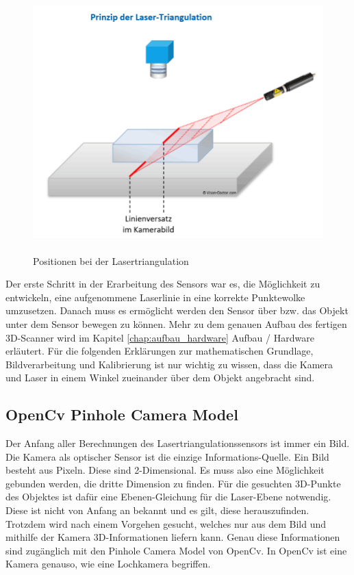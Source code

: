 	\begin{figure}[h]
		\centering
		\includegraphics[height=10cm]{img/grundlagen/lasertriangulation_2}
		\caption{Positionen bei der Lasertriangulation}
		\label{lasertriangulation}
	\end{figure}
	
	Der erste Schritt in der Erarbeitung des Sensors war es, die Möglichkeit zu entwickeln, eine aufgenommene Laserlinie in eine korrekte Punktewolke umzusetzen. Danach muss es ermöglicht werden den Sensor über bzw. das Objekt unter dem Sensor bewegen zu können. Mehr zu dem genauen Aufbau des fertigen 3D-Scanner wird im Kapitel \ref{chap:aufbau_hardware} Aufbau / Hardware erläutert. Für die folgenden Erklärungen zur mathematischen Grundlage, Bildverarbeitung und Kalibrierung ist nur wichtig zu wissen, dass die Kamera und Laser in einem Winkel zueinander über dem Objekt angebracht sind. 
	
	\subsection{OpenCv Pinhole Camera Model}
	Der Anfang aller Berechnungen des Lasertriangulationssensors ist immer ein Bild. Die Kamera als optischer Sensor ist die einzige Informations-Quelle. Ein Bild besteht aus Pixeln. Diese sind 2-Dimensional. Es muss also eine Möglichkeit gebunden werden, die dritte Dimension zu finden. Für die gesuchten 3D-Punkte des Objektes ist dafür eine Ebenen-Gleichung für die Laser-Ebene notwendig. Diese ist nicht von Anfang an bekannt und es gilt, diese herauszufinden. Trotzdem wird nach einem Vorgehen gesucht, welches nur aus dem Bild und mithilfe der Kamera 3D-Informationen liefern kann. Genau diese Informationen sind zugänglich mit den Pinhole Camera Model von OpenCv. In OpenCv ist eine Kamera genauso, wie eine Lochkamera begriffen.
	
